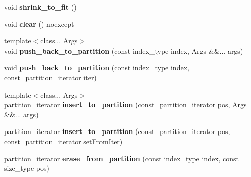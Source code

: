 \begin{DoxyCompactItemize}
\mbox{\label{classsequoia_1_1data__structures_1_1contiguous__storage__base_aa1c90351c21b4f544d004a179fca9047}} 
void {\bfseries shrink\+\_\+to\+\_\+fit} ()
\item 
\mbox{\label{classsequoia_1_1data__structures_1_1contiguous__storage__base_a086ff5af28ec53d2ca6dd49f70d401f7}} 
void {\bfseries clear} () noexcept
\item 
\mbox{\label{classsequoia_1_1data__structures_1_1contiguous__storage__base_a7b2930364c984ebff76d7751b140a91c}} 
{\footnotesize template$<$class... Args$>$ }\\void {\bfseries push\+\_\+back\+\_\+to\+\_\+partition} (const index\+\_\+type index, Args \&\&... args)
\item 
\mbox{\label{classsequoia_1_1data__structures_1_1contiguous__storage__base_a86f40afb375ac23005ec03e3850967f2}} 
void {\bfseries push\+\_\+back\+\_\+to\+\_\+partition} (const index\+\_\+type index, const\+\_\+partition\+\_\+iterator iter)
\item 
\mbox{\label{classsequoia_1_1data__structures_1_1contiguous__storage__base_ac0c428965c2e5ba9e86756109ea98d1d}} 
{\footnotesize template$<$class... Args$>$ }\\partition\+\_\+iterator {\bfseries insert\+\_\+to\+\_\+partition} (const\+\_\+partition\+\_\+iterator pos, Args \&\&... args)
\item 
\mbox{\label{classsequoia_1_1data__structures_1_1contiguous__storage__base_a141cb4205c2461bd3aa702249638104f}} 
partition\+\_\+iterator {\bfseries insert\+\_\+to\+\_\+partition} (const\+\_\+partition\+\_\+iterator pos, const\+\_\+partition\+\_\+iterator set\+From\+Iter)
\item 
\mbox{\label{classsequoia_1_1data__structures_1_1contiguous__storage__base_a50a7542acf13fd539e6aeb63e071b8f1}} 
partition\+\_\+iterator {\bfseries erase\+\_\+from\+\_\+partition} (const index\+\_\+type index, const size\+\_\+type pos)

\end{DoxyCompactItemize}
